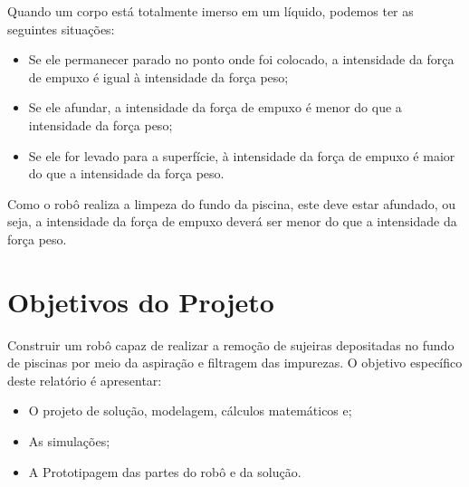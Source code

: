 Quando um corpo está totalmente imerso em um líquido, podemos ter as seguintes situações: 

\begin{itemize}
\item Se ele permanecer parado no ponto onde foi colocado, a intensidade da força de empuxo é igual à intensidade da força peso;
\item Se ele afundar, a intensidade da força de empuxo é menor do que a intensidade da força peso;
\item Se ele for levado para a superfície, à intensidade da força de empuxo é maior do que a intensidade da força peso.
\end{itemize}

Como o robô realiza a limpeza do fundo da piscina, este deve estar afundado, ou seja, a intensidade da força de empuxo deverá ser menor do que a intensidade da força peso.

\section{Objetivos do Projeto}
Construir um robô capaz de realizar a remoção de sujeiras depositadas no fundo de piscinas por meio da aspiração e filtragem das impurezas. O objetivo específico deste relatório é apresentar:

\begin{itemize}
\item O projeto de solução, modelagem, cálculos matemáticos e; 
\item As simulações; 
\item A Prototipagem das partes do robô e da solução.
\end{itemize}

